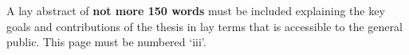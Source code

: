 \pagestyle{plain}

A lay abstract of \textbf{not more 150 words} must be included explaining the key goals and contributions of the thesis in lay terms that is accessible to the general public. This page must be numbered ‘iii’.
